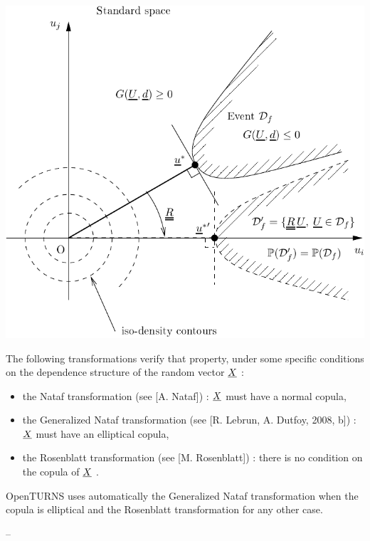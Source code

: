 {  %
  \begin{center}
    \includegraphics{Figures/FigureRotationFinal.pdf}
  \end{center}
  \label{Invariance}

  The following transformations verify that property, under some specific conditions on the dependence structure of the random vector ${\underline{X}}$ :
  \begin{itemize}
  \item the Nataf transformation (see [A. Nataf]) : ${\underline{X}}$ must have a normal copula,
  \item the Generalized Nataf transformation (see [R. Lebrun, A. Dutfoy, 2008, b]) : ${\underline{X}}$ must have an elliptical copula,
  \item the Rosenblatt transformation (see [M. Rosenblatt]) : there is no condition on the copula of ${\underline{X}}$ .
  \end{itemize}

  OpenTURNS uses automatically the Generalized Nataf transformation when the copula is elliptical and the Rosenblatt transformation for any other case.
}
{
  --}

